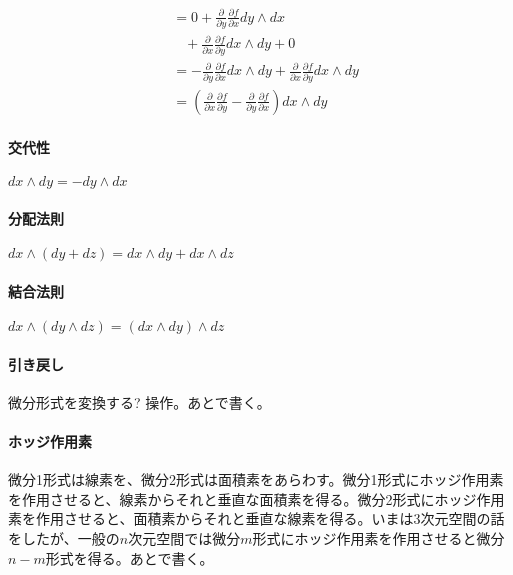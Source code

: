 \begin{equation*}
\begin{split}
&= 0 + \frac{\partial}{\partial y} \frac{\partial f}{\partial x} dy \wedge dx \\
& \; \; \; + \frac{\partial}{\partial x} \frac{\partial f}{\partial y} dx \wedge dy + 0 \\
&= - \frac{\partial}{\partial y} \frac{\partial f}{\partial x} dx \wedge dy + \frac{\partial}{\partial x} \frac{\partial f}{\partial y} dx \wedge dy \\
&= ( \frac{\partial}{\partial x} \frac{\partial f}{\partial y} - \frac{\partial}{\partial y} \frac{\partial f}{\partial x} ) dx \wedge dy
\end{split}
\end{equation*}

\paragraph{交代性}

$ d x \wedge d y = - d y \wedge d x $

\paragraph{分配法則}

$ d x \wedge ( d y + d z ) = d x \wedge d y + d x \wedge d z $

\paragraph{結合法則}

$ d x \wedge (d y \wedge d z) = (d x \wedge d y) \wedge d z $

\paragraph{引き戻し}

微分形式を変換する? 操作。あとで書く。

\paragraph{ホッジ作用素}

微分1形式は線素を、微分2形式は面積素をあらわす。微分1形式にホッジ作用素を作用させると、線素からそれと垂直な面積素を得る。微分2形式にホッジ作用素を作用させると、面積素からそれと垂直な線素を得る。いまは3次元空間の話をしたが、一般の$n$次元空間では微分$m$形式にホッジ作用素を作用させると微分$n-m$形式を得る。あとで書く。

